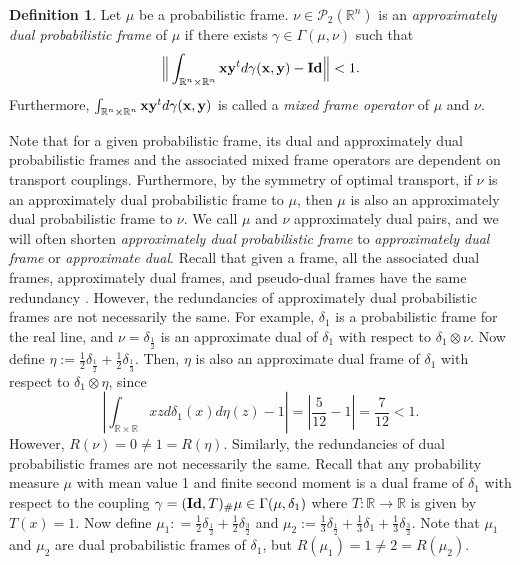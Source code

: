 \documentclass{amsart}
\numberwithin{equation}{section}
\newcommand{\bI}{{\bf Id}}
\theoremstyle{plain}
\theoremstyle{remark}
\theoremstyle{definition}
\newtheorem{definition}[theorem]{Definition}
\begin{document}
\begin{definition}\label{def:approximate dual}
     Let   $\mu$ be a probabilistic frame. $\nu \in \mathcal{P}_2(\mathbb{R}^n)$ is an \emph{approximately dual probabilistic frame} of $\mu$ if there exists $\gamma \in \Gamma(\mu, \nu)$ such that
     \begin{equation*}
     \Big \| \int_{\mathbb{R}^n \times \mathbb{R}^n} {\bf x}{\bf y}^t d\gamma({\bf x, y}) - {\bf Id} \Big \| < 1 .
\end{equation*}
Furthermore, $\int_{\mathbb{R}^n \times \mathbb{R}^n} {\bf x}{\bf y}^t d\gamma({\bf x, y})$ is called a \emph{mixed frame operator} of $\mu$ and $\nu$.
\end{definition}


Note that for a given probabilistic frame, its dual and approximately dual probabilistic frames and the associated mixed frame operators are dependent on transport couplings. Furthermore, by the symmetry of optimal transport, if $\nu$ is an approximately dual probabilistic frame to $\mu$, then $\mu$ is also an approximately dual probabilistic frame to $\nu$. We call $\mu$ and $\nu$ approximately dual pairs, and we will often shorten \emph{approximately dual probabilistic frame} to \emph{approximately dual frame} or \emph{approximate dual}.  Recall that given a frame, all the associated dual frames, approximately dual frames, and pseudo-dual frames have the same redundancy \cite{bakic2015excesses}. 
However, the redundancies of approximately dual probabilistic frames are not necessarily the same. For example, $\delta_1$ is a probabilistic frame for the real line, and $\nu = \delta_{\frac{1}{2}}$ is an approximate dual of $\delta_1$ with respect to $\delta_1 \otimes \nu$. Now define $\eta  := \frac{1}{2}\delta_{\frac{1}{2}} + \frac{1}{2}\delta_{\frac{1}{3}}$. Then, $\eta$ is also an approximate dual frame of $\delta_1$ with respect to $\delta_1 \otimes \eta$, since
\begin{equation*}
  \left|  \int_{\mathbb{R} \times \mathbb{R}} xz d\delta_1(x) d\eta(z) -1 \right| = \left| \frac{5}{12}-1 \right|= \frac{7}{12}<1.
\end{equation*}
However, $R(\nu) =0 \neq 1 = R(\eta)$. Similarly, the redundancies of dual probabilistic frames are not necessarily the same. Recall that any probability measure $\mu$ with mean value 1 and finite second moment is a dual frame of $\delta_1$ with respect to the coupling $\gamma = (\bI, T)_\#\mu \in \Gamma(\mu, \delta_1)$ where $T:\mathbb{R} \rightarrow \mathbb{R}$ is given by $T(x) = 1$.  Now define $\mu_1: = \frac{1}{2}\delta_{\frac{1}{2}} + \frac{1}{2}\delta_{\frac{3}{2}}$ and $\mu_2 := \frac{1}{3}\delta_{\frac{1}{2}} + \frac{1}{3}\delta_{1} + \frac{1}{3}\delta_{\frac{3}{2}}$. Note that $\mu_1$ and $\mu_2$ are dual probabilistic frames of $\delta_1$, but $R(\mu_1) = 1 \neq 2 = R(\mu_2)$.
\end{document}
